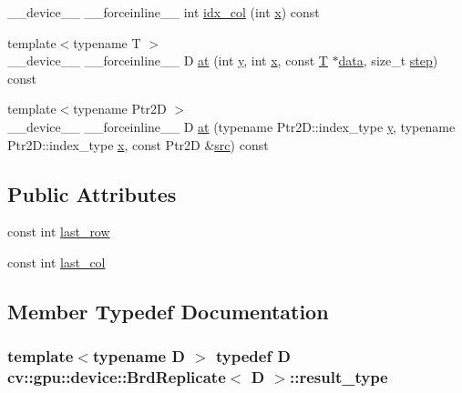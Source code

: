\begin{DoxyCompactItemize}
\item 
\-\_\-\-\_\-device\-\_\-\-\_\- \-\_\-\-\_\-forceinline\-\_\-\-\_\- int \hyperlink{structcv_1_1gpu_1_1device_1_1BrdReplicate_a955d599b3f9bc63c4aae49142a216a20}{idx\-\_\-col} (int \hyperlink{highgui__c_8h_a6150e0515f7202e2fb518f7206ed97dc}{x}) const 
\item 
{\footnotesize template$<$typename T $>$ }\\\-\_\-\-\_\-device\-\_\-\-\_\- \-\_\-\-\_\-forceinline\-\_\-\-\_\- D \hyperlink{structcv_1_1gpu_1_1device_1_1BrdReplicate_ae0bd9dcb8afa382bde1a9bbb85020cf7}{at} (int \hyperlink{highgui__c_8h_af1202c02b14870c18fb3a1da73e9e7c7}{y}, int \hyperlink{highgui__c_8h_a6150e0515f7202e2fb518f7206ed97dc}{x}, const \hyperlink{calib3d_8hpp_a3efb9551a871ddd0463079a808916717}{T} $\ast$\hyperlink{legacy_8hpp_ab9fe6c09e6d02865a953fffc12fe6ca0}{data}, size\-\_\-t \hyperlink{legacy_8hpp_abc16e65f240ed0c8f3e876e8732c0a33}{step}) const 
\item 
{\footnotesize template$<$typename Ptr2\-D $>$ }\\\-\_\-\-\_\-device\-\_\-\-\_\- \-\_\-\-\_\-forceinline\-\_\-\-\_\- D \hyperlink{structcv_1_1gpu_1_1device_1_1BrdReplicate_a1c4622442b14f2d2603565612e0facbc}{at} (typename Ptr2\-D\-::index\-\_\-type \hyperlink{highgui__c_8h_af1202c02b14870c18fb3a1da73e9e7c7}{y}, typename Ptr2\-D\-::index\-\_\-type \hyperlink{highgui__c_8h_a6150e0515f7202e2fb518f7206ed97dc}{x}, const Ptr2\-D \&\hyperlink{legacy_8hpp_a371cd109b74033bc4366f584edd3dacc}{src}) const 
\end{DoxyCompactItemize}
\subsection*{Public Attributes}
\begin{DoxyCompactItemize}
\item 
const int \hyperlink{structcv_1_1gpu_1_1device_1_1BrdReplicate_adf9331d9150edf1a5108d4c2188818ec}{last\-\_\-row}
\item 
const int \hyperlink{structcv_1_1gpu_1_1device_1_1BrdReplicate_a5778af0f4fd7fe97cddcf9db5b09a0c3}{last\-\_\-col}
\end{DoxyCompactItemize}


\subsection{Member Typedef Documentation}
\hypertarget{structcv_1_1gpu_1_1device_1_1BrdReplicate_af4ede6ffd2d31c3bdf73d04f720cd1ec}{
\subsubsection[{result\-\_\-type}]{\setlength{\rightskip}{0pt plus 5cm}template$<$typename D $>$ typedef D {\bf cv\-::gpu\-::device\-::\-Brd\-Replicate}$<$ D $>$\-::{\bf result\-\_\-type}}}\label{structcv_1_1gpu_1_1device_1_1BrdReplicate_af4ede6ffd2d31c3bdf73d04f720cd1ec}


